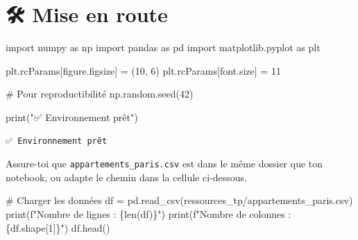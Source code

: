 \documentclass[
  french,
  11pt,
  a4paper,
]{scrbook}
\newenvironment{Shaded}{}{}
\newcommand{\BuiltInTok}[1]{\textcolor[rgb]{0.84,0.23,0.29}{#1}}
\newcommand{\CommentTok}[1]{\textcolor[rgb]{0.42,0.45,0.49}{#1}}
\newcommand{\DecValTok}[1]{\textcolor[rgb]{0.00,0.36,0.77}{#1}}
\newcommand{\ImportTok}[1]{\textcolor[rgb]{0.01,0.18,0.38}{#1}}
\newcommand{\NormalTok}[1]{\textcolor[rgb]{0.14,0.16,0.18}{#1}}
\newcommand{\OperatorTok}[1]{\textcolor[rgb]{0.14,0.16,0.18}{#1}}
\newcommand{\SpecialCharTok}[1]{\textcolor[rgb]{0.00,0.36,0.77}{#1}}
\newcommand{\SpecialStringTok}[1]{\textcolor[rgb]{0.01,0.18,0.38}{#1}}
\newcommand{\StringTok}[1]{\textcolor[rgb]{0.01,0.18,0.38}{#1}}
\begin{document}
\chapter{🛠️ Mise en route}\label{mise-en-route-3}

\protect{}\label{setup}
\begin{Shaded}
\begin{Highlighting}[]
\ImportTok{import}\NormalTok{ numpy }\ImportTok{as}\NormalTok{ np}
\ImportTok{import}\NormalTok{ pandas }\ImportTok{as}\NormalTok{ pd}
\ImportTok{import}\NormalTok{ matplotlib.pyplot }\ImportTok{as}\NormalTok{ plt}

\NormalTok{plt.rcParams[}\StringTok{\textquotesingle{}figure.figsize\textquotesingle{}}\NormalTok{] }\OperatorTok{=}\NormalTok{ (}\DecValTok{10}\NormalTok{, }\DecValTok{6}\NormalTok{)}
\NormalTok{plt.rcParams[}\StringTok{\textquotesingle{}font.size\textquotesingle{}}\NormalTok{] }\OperatorTok{=} \DecValTok{11}

\CommentTok{\# Pour reproductibilité}
\NormalTok{np.random.seed(}\DecValTok{42}\NormalTok{)}

\BuiltInTok{print}\NormalTok{(}\StringTok{"✅ Environnement prêt"}\NormalTok{)}
\end{Highlighting}
\end{Shaded}

\begin{verbatim}
✅ Environnement prêt
\end{verbatim}

\begin{tcolorbox}[enhanced jigsaw, arc=.35mm, bottomrule=.15mm, bottomtitle=1mm, breakable, colback=white, colbacktitle=quarto-callout-note-color!10!white, colframe=quarto-callout-note-color-frame, coltitle=black, left=2mm, leftrule=.75mm, opacityback=0, opacitybacktitle=0.6, rightrule=.15mm, title=\textcolor{quarto-callout-note-color}{\faInfo}\hspace{0.5em}{📁 Récupération du dataset}, titlerule=0mm, toprule=.15mm, toptitle=1mm]

Assure-toi que \texttt{appartements\_paris.csv} est dans le même dossier
que ton notebook, ou adapte le chemin dans la cellule ci-dessous.

\end{tcolorbox}

\begin{Shaded}
\begin{Highlighting}[]
\CommentTok{\# Charger les données}
\NormalTok{df }\OperatorTok{=}\NormalTok{ pd.read\_csv(}\StringTok{\textquotesingle{}ressources\_tp/appartements\_paris.csv\textquotesingle{}}\NormalTok{)}
\BuiltInTok{print}\NormalTok{(}\SpecialStringTok{f"Nombre de lignes : }\SpecialCharTok{\{}\BuiltInTok{len}\NormalTok{(df)}\SpecialCharTok{\}}\SpecialStringTok{"}\NormalTok{)}
\BuiltInTok{print}\NormalTok{(}\SpecialStringTok{f"Nombre de colonnes : }\SpecialCharTok{\{}\NormalTok{df}\SpecialCharTok{.}\NormalTok{shape[}\DecValTok{1}\NormalTok{]}\SpecialCharTok{\}}\SpecialStringTok{"}\NormalTok{)}
\NormalTok{df.head()}
\end{Highlighting}
\end{Shaded}
\end{document}
